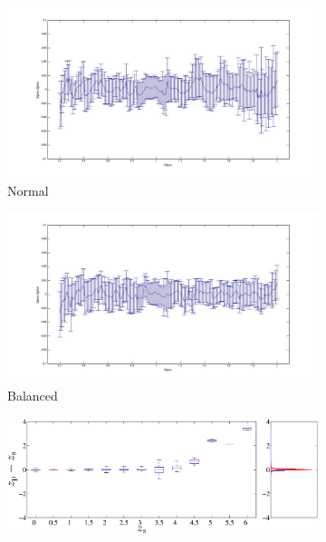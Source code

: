 \documentclass[useAMS,usenatbib,fleqn]{mn2e}
\begin{document}
\begin{figure}
        \centering
        \begin{subfigure}[b]{\columnwidth}
                \includegraphics[width=\textwidth]{figures/Zspec-Zphot_normal}
                \caption{Normal}
                \label{fig-normal}
        \end{subfigure}	
        \begin{subfigure}[b]{\columnwidth}
                \includegraphics[width=\textwidth]{figures/Zspec-Zphot_balanced}
                \caption{Balanced}
                \label{fig-balanced}
        \end{subfigure}
       \begin{subfigure}[b]{\columnwidth}
                \includegraphics[width=\textwidth]{figures/Zspec-Zphot_normalised}

\end{subfigure}
\end{figure}
\end{document}
